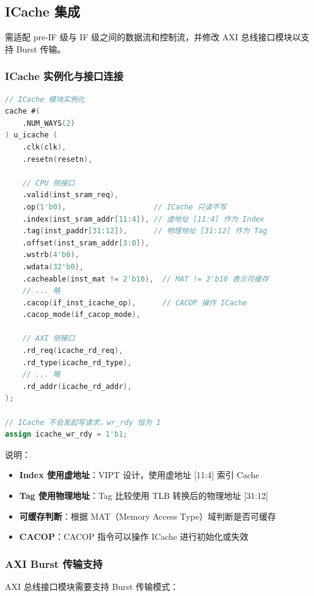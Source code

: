 \subsection{ICache 集成}

需适配 pre-IF 级与 IF 级之间的数据流和控制流，并修改 AXI 总线接口模块以支持 Burst 传输。

\subsubsection{ICache 实例化与接口连接}

\begin{lstlisting}[language=Verilog, caption=ICache 实例化]
// ICache 模块实例化
cache #(
    .NUM_WAYS(2)
) u_icache (
    .clk(clk),
    .resetn(resetn),
    
    // CPU 侧接口
    .valid(inst_sram_req),
    .op(1'b0),                    // ICache 只读不写
    .index(inst_sram_addr[11:4]), // 虚地址 [11:4] 作为 Index
    .tag(inst_paddr[31:12]),      // 物理地址 [31:12] 作为 Tag
    .offset(inst_sram_addr[3:0]),
    .wstrb(4'b0),
    .wdata(32'b0),
    .cacheable(inst_mat != 2'b10),  // MAT != 2'b10 表示可缓存
    // ... 略
    .cacop(if_inst_icache_op),      // CACOP 操作 ICache
    .cacop_mode(if_cacop_mode),
    
    // AXI 侧接口
    .rd_req(icache_rd_req),
    .rd_type(icache_rd_type),
    // ... 略
    .rd_addr(icache_rd_addr),
);

// ICache 不会发起写请求，wr_rdy 恒为 1
assign icache_wr_rdy = 1'b1;
\end{lstlisting}

说明：
\begin{itemize}
    \item \textbf{Index 使用虚地址}：VIPT 设计，使用虚地址 [11:4] 索引 Cache
    \item \textbf{Tag 使用物理地址}：Tag 比较使用 TLB 转换后的物理地址 [31:12]
    \item \textbf{可缓存判断}：根据 MAT（Memory Access Type）域判断是否可缓存
    \item \textbf{CACOP}：CACOP 指令可以操作 ICache 进行初始化或失效
\end{itemize}

\subsubsection{AXI Burst 传输支持}

AXI 总线接口模块需要支持 Burst 传输模式：

